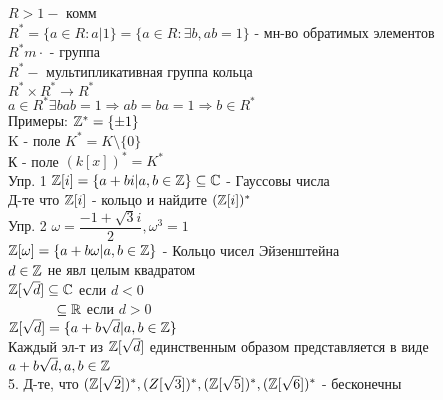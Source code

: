 $ R > 1 - $ комм \\
$ R^* = \{ a \in R : a | 1 \} = \{ a \in R : \exists b, ab=1 \} $ - мн-во обратимых элементов \\
$ R^*m \cdot $ - группа \\
$ R^* - $ мультипликативная группа кольца \\
$ R^* \times R^* \rightarrow R^* $\\
$ a \in R^* \exists b ab=1 \Rightarrow ab = ba = 1 \Rightarrow b \in R^* $\\
Примеры: $ \mathbb{Z}^* = \{\pm 1\} $ \\
K - поле $ K^* = K \setminus \{0\} $\\
К - поле $ (k[x])^* = K^* $ \\
Упр. 1 $ \mathbb{Z}[i] = \{ a + bi | a,b \in \mathbb{Z} \} \subseteq \mathbb{C} $ - Гауссовы числа\\
Д-те что $ \mathbb{Z}[i] $ - кольцо и найдите $(\mathbb{Z}[i])^* $\\
Упр. 2 $ \omega = \dfrac{-1 + \sqrt{3} i}{2}, \omega^3 = 1 $ \\
$ \mathbb{Z}[\omega] = \{ a + b\omega | a,b \in \mathbb{Z} \} $ - Кольцо чисел Эйзенштейна \\
$ d \in \mathbb{Z} $ не явл целым квадратом \\
$ \mathbb{Z}[\sqrt{d}] \subseteq \mathbb{C} $ если $ d < 0 $ \\
$ \hspace*{12mm} \subseteq \R $ если $ d > 0 $ \\
$ \mathbb{Z}[\sqrt{d}] = \{ a + b\sqrt{d} | a, b \in \mathbb{Z}  \} $ \\
Каждый эл-т из $ \mathbb{Z}[\sqrt{d}] $ единственным образом представляется в виде $ a + b\sqrt{d}, a,b \in \mathbb{Z} $ \\
5. Д-те, что $ (\mathbb{Z}[\sqrt{2}])^*, (Z[\sqrt{3}])^*, (\mathbb{Z}[\sqrt{5}])^*, (\mathbb{Z}[\sqrt{6}])^* $ - бесконечны \\ %


